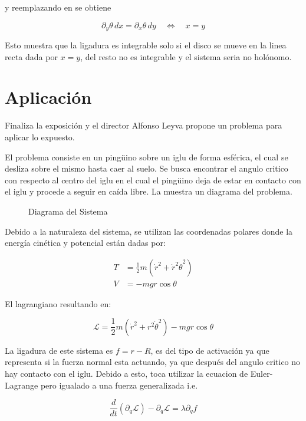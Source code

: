 \documentclass{article}
\theoremstyle{definition}
\begin{document}
y reemplazando en  se obtiene

\begin{equation}
	\partial_y \theta \, dx = \partial_x \theta \, dy \quad \iff \quad x = y
\end{equation}

Esto muestra que la ligadura es integrable solo si el disco se mueve en la linea recta dada por $x = y$, del resto no es integrable y el sistema seria no holónomo.

\section{Aplicación}
Finaliza la exposición y el director Alfonso Leyva propone un problema para aplicar lo expuesto.

El problema consiste en un pingüino sobre un iglu de forma esférica, el cual se desliza sobre el mismo hasta caer al suelo. Se busca encontrar el angulo critico con respecto al centro del iglu en el cual el pingüino deja de estar en contacto con el iglu y procede a seguir en caída libre. La  muestra un diagrama del problema.


\begin{figure}[htbp!]
	\caption{Diagrama del Sistema}
	\label{fig:iglu}
\end{figure}

Debido a la naturaleza del sistema, se utilizan las coordenadas polares donde la energía cinética y potencial están dadas por:

\begin{align}
	T &= \frac{1}{2} m \left(\dot{r}^2 + \dot{r}^2 \dot{\theta}^2 \right) \\
	V &= -mgr\cos{\theta}
\end{align}

El lagrangiano resultando en:

\begin{equation}
	\mathcal{L} = \frac{1}{2}m \left(\dot{r}^2 + r^2\dot{\theta}^2 \right) - mgr\cos{\theta}
\end{equation}

La ligadura de este sistema es $f = r - R$, es del tipo de activación ya que representa si la fuerza normal esta actuando, ya que después del angulo critico no hay contacto con el iglu. Debido a esto, toca utilizar la ecuacion de Euler-Lagrange pero igualado a una fuerza generalizada i.e.

\begin{equation}
	\frac{d}{dt}\left(\partial_{\dot{q}} \mathcal{L}\right) - \partial_q \mathcal{L} = \lambda \partial_{q}f
\end{equation}
\end{document}
